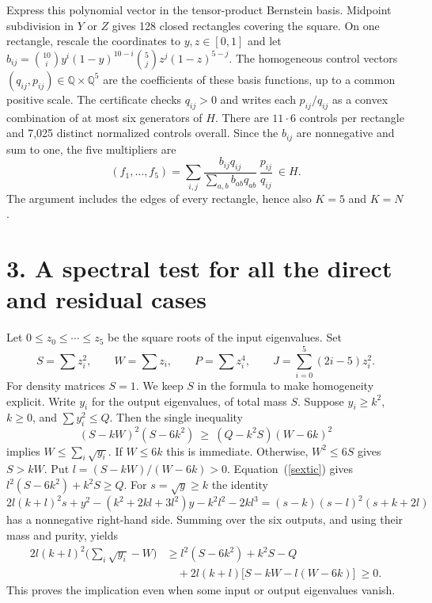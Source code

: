 \documentclass[11pt,a4paper]{article}
\begin{document}
Express this polynomial vector in the tensor-product Bernstein basis. Midpoint subdivision in $Y$ or $Z$ gives 128 closed rectangles covering the square. On one rectangle, rescale the coordinates to $y,z\in[0,1]$ and let $b_{ij}=\binom{10}i y^i(1-y)^{10-i}\binom5j z^j(1-z)^{5-j}$. The homogeneous control vectors $(q_{ij},p_{ij})\in\mathbb Q\times\mathbb Q^5$ are the coefficients of these basis functions, up to a common positive scale. The certificate checks $q_{ij}>0$ and writes each $p_{ij}/q_{ij}$ as a convex combination of at most six generators of $H$. There are $11\cdot6$ controls per rectangle and 7,025 distinct normalized controls overall. Since the $b_{ij}$ are nonnegative and sum to one, the five multipliers are
\[
 (f_1,\ldots,f_5)
   =\sum_{i,j}\frac{b_{ij}q_{ij}}{\sum_{a,b}b_{ab}q_{ab}}\,
                        \frac{p_{ij}}{q_{ij}}\ \in H .
\]
The argument includes the edges of every rectangle, hence also $K=5$ and $K=N$.


\newpage
\section*{3. A spectral test for all the direct and residual cases}
Let $0\le z_0\le\cdots\le z_5$ be the square roots of the input eigenvalues. Set
\[
 S=\sum z_i^2,\qquad W=\sum z_i,\qquad P=\sum z_i^4,\qquad J=\sum_{i=0}^5(2i-5)z_i^2 .
\]
For density matrices $S=1$. We keep $S$ in the formula to make homogeneity explicit. Write $y_i$ for the output eigenvalues, of total mass $S$. Suppose $y_i\ge k^2$, $k\ge0$, and $\sum y_i^2\le Q$. Then the single inequality
\begin{equation}
 (S-kW)^2(S-6k^2)\ \ge\ (Q-k^2S)(W-6k)^2 \label{sextic}
\end{equation}
implies $W\le\sum_i\sqrt{y_i}$. If $W\le6k$ this is immediate. Otherwise, $W^2\le6S$ gives $S>kW$. Put $l=(S-kW)/(W-6k)>0$. Equation~(\ref{sextic}) gives $l^2(S-6k^2)+k^2 S\ge Q$. For $s=\sqrt{y}\ge k$ the identity
\[
 2l(k+l)^2s+y^2-(k^2+2kl+3l^2)y-k^2l^2-2kl^3
       =(s-k)(s-l)^2(s+k+2l)
\]
has a nonnegative right-hand side. Summing over the six outputs, and using their mass and purity, yields
\begin{align*}
 2l(k+l)^2\Big(\sum_i\sqrt{y_i}-W\Big)
 &\ge l^2(S-6k^2)+k^2 S-Q\\[-2pt]
 &\quad+2l(k+l)\big[S-kW-l(W-6k)\big]\ \ge 0.
\end{align*}
This proves the implication even when some input or output eigenvalues vanish.
\end{document}
